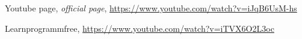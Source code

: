 \begin{thebibliography}{99999}
\singlespace\normalsize

 Youtube page, \textit{ official page}, \url{https://www.youtube.com/watch?v=iJqB6UsM-hs}

 Learnprogrammfree, \url{https://www.youtube.com/watch?v=iTVX6O2L3oc}


\end{thebibliography}
